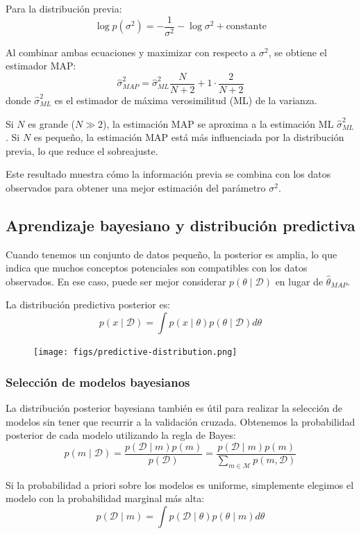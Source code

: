 Para la distribución previa:
$$ \log p(\sigma^2) = -\frac{1}{\sigma^2} - \log \sigma^2 + \text{constante}$$

Al combinar ambas ecuaciones y maximizar con respecto a $\sigma^2$, se obtiene el estimador MAP:
$$\hat{\sigma}^2_{MAP} = \hat{\sigma}^2_{ML} \frac{N}{N+2} + 1 \cdot \frac{2}{N+2}$$
donde $\hat{\sigma}^2_{ML}$ es el estimador de máxima verosimilitud (ML) de la varianza.

Si $N$ es grande ($N \gg 2$), la estimación MAP se aproxima a la estimación ML $\hat{\sigma}^2_{ML}$. Si $N$ es pequeño, la estimación MAP está más influenciada por la distribución previa, lo que reduce el sobreajuste.

Este resultado muestra cómo la información previa se combina con los datos observados para obtener una mejor estimación del parámetro $\sigma^2$.

\subsection{Aprendizaje bayesiano y distribución predictiva}
Cuando tenemos un conjunto de datos pequeño, la posterior es amplia, lo que indica que muchos conceptos potenciales son compatibles con los datos observados.
En ese caso, puede ser mejor considerar $p(\theta \mid \mathcal{D})$ en lugar de $\hat{\theta}_{MAP}$.

La distribución predictiva posterior es:
$$p(x \mid \mathcal{D}) = \int p(x \mid \theta) p(\theta \mid \mathcal{D}) d\theta$$

\begin{figure}[h]
\centering
\texttt{[image: figs/predictive-distribution.png]}
\end{figure}

\subsubsection{Selección de modelos bayesianos}
La distribución posterior bayesiana también es útil para realizar la selección de modelos sin tener que recurrir a la validación cruzada. Obtenemos la probabilidad posterior de cada modelo utilizando la regla de Bayes:
$$p(m \mid \mathcal{D}) = \frac{p(\mathcal{D} \mid m) p(m)}{p(\mathcal{D})} = \frac{p(\mathcal{D} \mid m) p(m)}{\sum_{m \in \mathcal{M}} p(m, \mathcal{D})}$$

Si la probabilidad a priori sobre los modelos es uniforme, simplemente elegimos el modelo con la probabilidad marginal más alta:
$$p(\mathcal{D} \mid m) = \int p(\mathcal{D} \mid \theta) p(\theta \mid m) d\theta$$

